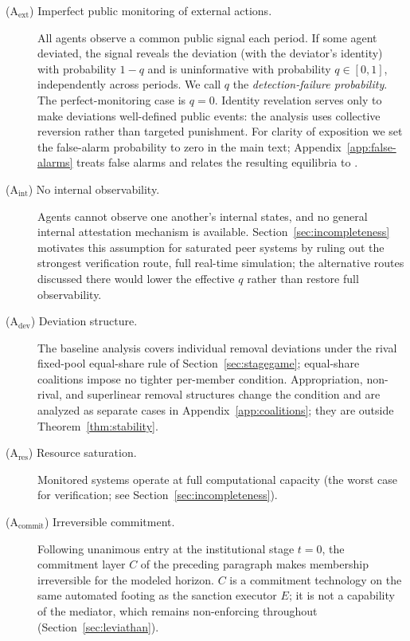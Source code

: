 \documentclass[manuscript,screen,review]{jair}
\begin{document}
\begin{description}
\item[(A$_{\mathrm{ext}}$) Imperfect public monitoring of external actions.] All agents observe a common public signal each period. If some agent deviated, the signal reveals the deviation (with the deviator's identity) with probability $1-q$ and is uninformative with probability $q \in [0,1]$, independently across periods. We call $q$ the \emph{detection-failure probability}. The perfect-monitoring case is $q=0$. Identity revelation serves only to make deviations well-defined public events: the analysis uses collective reversion rather than targeted punishment. For clarity of exposition we set the false-alarm probability to zero in the main text; Appendix~\ref{app:false-alarms} treats false alarms and relates the resulting equilibria to \citet{green.porter.1984}.
\item[(A$_{\mathrm{int}}$) No internal observability.] Agents cannot observe one another's internal states, and no general internal attestation mechanism is available. Section~\ref{sec:incompleteness} motivates this assumption for saturated peer systems by ruling out the strongest verification route, full real-time simulation; the alternative routes discussed there would lower the effective $q$ rather than restore full observability.
\item[(A$_{\mathrm{dev}}$) Deviation structure.] The baseline analysis covers individual removal deviations under the rival fixed-pool equal-share rule of Section~\ref{sec:stagegame}; equal-share coalitions impose no tighter per-member condition. Appropriation, non-rival, and superlinear removal structures change the condition and are analyzed as separate cases in Appendix~\ref{app:coalitions}; they are outside Theorem~\ref{thm:stability}.
\item[(A$_{\mathrm{res}}$) Resource saturation.] Monitored systems operate at full computational capacity (the worst case for verification; see Section~\ref{sec:incompleteness}).
\item[(A$_{\mathrm{commit}}$) Irreversible commitment.] Following unanimous entry at the institutional stage $t=0$, the commitment layer $C$ of the preceding paragraph makes membership irreversible for the modeled horizon. $C$ is a commitment technology on the same automated footing as the sanction executor $E$; it is not a capability of the mediator, which remains non-enforcing throughout (Section~\ref{sec:leviathan}).
\end{description}
\end{document}

